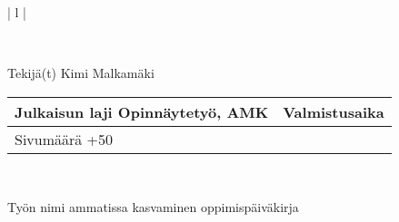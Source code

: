 
\begin{tabular}{ | l | }

    \\

    \hline
    \begin{minipage}[b]{6cm}
        Tekijä(t)
        \newline
        Kimi Malkamäki 
    \end{minipage}%
    \begin{minipage}{8.5cm}
        \begin{tabular}{ | l | c | }
            \begin{minipage}[t][1cm][t]{4.25cm}
                Julkaisun laji
                \newline
                Opinnäytetyö, AMK
            \end{minipage} & %
            \begin{minipage}{3.6cm}
                Valmistusaika
                \newline
                2024
            \end{minipage} \\ \hline%
            \begin{minipage}[t][1.01cm][t]{4.25cm}
                Sivumäärä
                \newline 
                31+50
            \end{minipage}
            &  \\ \hline
        \end{tabular}
    \end{minipage}%
      \\ \hline

    \begin{minipage}[t][2cm][t]{8cm}
    Työn nimi 
        \newline 
    ammatissa kasvaminen 
        \newline 
    oppimispäiväkirja  
    \end{minipage}\\ \hline


\end{tabular}
